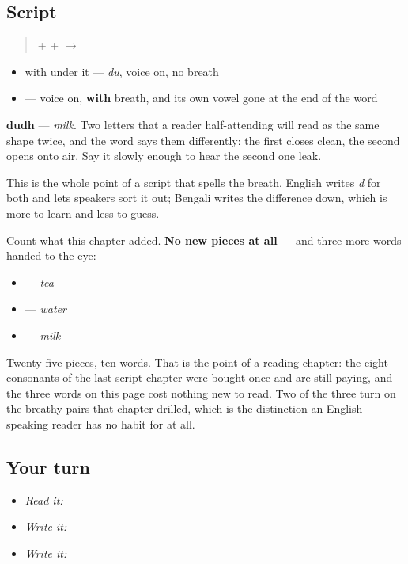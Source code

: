 \subsection*{Script}
\begin{quote}
\textbf{} + \textbf{} + \textbf{} $\to$ \textbf{}
\end{quote}

\begin{itemize}
\raggedright
  \item \textbf{} with \textbf{} under it — \emph{du}, voice on, no breath
  \item \textbf{} — voice on, \textbf{with} breath, and its own vowel gone at the end of the word
\end{itemize}

\textbf{dudh} — \emph{milk}. Two letters that a reader half-attending will read as the same shape twice, and the word says them differently: the first closes clean, the second opens onto air. Say it slowly enough to hear the second one leak.

This is the whole point of a script that spells the breath. English writes \emph{d} for both and lets speakers sort it out; Bengali writes the difference down, which is more to learn and less to guess.

Count what this chapter added. \textbf{No new pieces at all} — and three more words handed to the eye:

\begin{itemize}
\raggedright
  \item \textbf{} — \emph{tea}
  \item \textbf{} — \emph{water}
  \item \textbf{} — \emph{milk}
\end{itemize}

Twenty-five pieces, ten words. That is the point of a reading chapter: the eight consonants of the last script chapter were bought once and are still paying, and the three words on this page cost nothing new to read. Two of the three turn on the breathy pairs that chapter drilled, which is the distinction an English-speaking reader has no habit for at all.

\subsection*{Your turn}
\begin{itemize}
\raggedright
  \item \emph{Read it:}   
  \item \emph{Write it:} 
  \item \emph{Write it:}   
\end{itemize}

